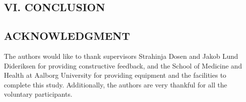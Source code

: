 \begin{multicols}{2}
	\subsection*{VI. CONCLUSION}%
	
%	
	
	
	
	\subsection*{ACKNOWLEDGMENT}
	
	The authors would like to thank supervisors Strahinja Dosen and Jakob Lund Dideriksen for providing constructive feedback, and the School of Medicine and Health at Aalborg University for providing equipment and the facilities to complete this study. Additionally, the authors are very thankful for all the voluntary participants. 


\renewcommand*{\bibfont}{\small}
	\printbibliography
	

	
	
\end{multicols}


